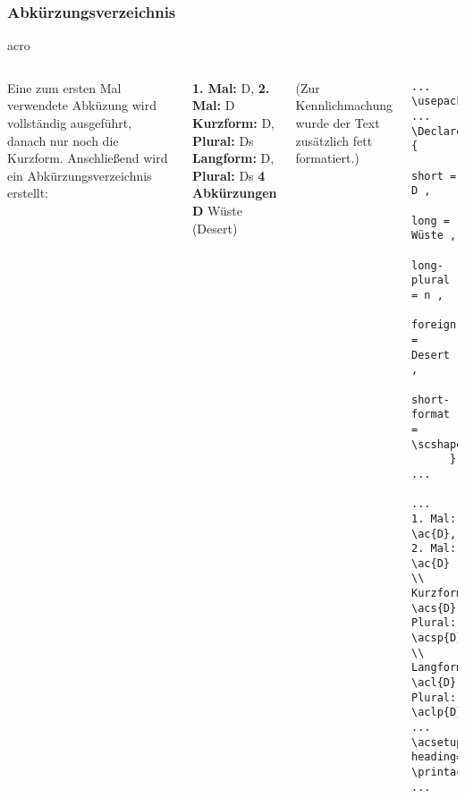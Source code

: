 \subsubsection{Abkürzungsverzeichnis}
\begin{frame}[fragile]{acro}

\begin{columns}[c]

    Eine zum ersten Mal verwendete Abküzung wird vollständig ausgeführt, danach nur noch die Kurzform. Anschließend wird ein Abkürzungsverzeichnis erstellt:
\vspace{\baselineskip}\linebreak

\begin{outputbox}
\textbf{1. Mal:} \ac{D}, \textbf{2. Mal:} \ac{D} \\
\textbf{Kurzform:} \acs{D}, \textbf{Plural:} \acsp{D} \\
\textbf{Langform:} \acl{D}, \textbf{Plural:} \aclp{D} 
\vspace{\baselineskip}\linebreak 
\vspace{\baselineskip}\linebreak 
{ \large\textbf{4 Abkürzungen}}
\vspace{\baselineskip}\linebreak
{\scshape\textbf{D}} \hspace{0.3ex} Wüste \hspace{0.3ex} (Desert)
\end{outputbox}
{\tiny (Zur Kennlichmachung wurde der Text zusätzlich fett formatiert.)}


\begin{lstlisting}[]
...
\usepackage{acro}
...
\DeclareAcronym{D}{
      short = D ,
      long = Wüste ,
      long-plural = n ,
      foreign = Desert ,
      short-format = \scshape 
      }
...

...
1. Mal: \ac{D}, 2. Mal: \ac{D} \\
Kurzform: \acs{D}, Plural: \acsp{D} \\
Langform: \acl{D}, Plural: \aclp{D} 
...
\acsetup{list-heading=section}
\printacronyms
...

\end{lstlisting}

    
  \end{columns}


\end{frame}

